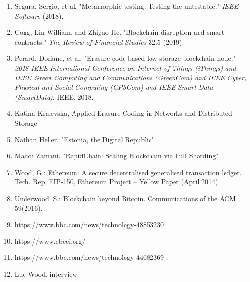 \documentclass[]{article}
\begin{document}
\begin{enumerate}
{  on Peer-to-Peer Systems}. Springer, Berlin, Heidelberg, 2002.
\item
  Segura, Sergio, et al. "Metamorphic testing: Testing the untestable."
  \emph{IEEE Software} (2018).
\item
  Cong, Lin William, and Zhiguo He. "Blockchain disruption and smart
  contracts." \emph{The Review of Financial Studies} 32.5 (2019).
\item
  Perard, Doriane, et al. "Erasure code-based low storage blockchain
  node." \emph{2018 IEEE International Conference on Internet of Things
  (iThings) and IEEE Green Computing and Communications (GreenCom) and
  IEEE Cyber, Physical and Social Computing (CPSCom) and IEEE Smart Data
  (SmartData)}. IEEE, 2018.
\item
  Katina Kralevska, Applied Erasure Coding in Networks and Distributed
  Storage
\item
  Nathan Heller. "Estonia, the Digital Republic"
\item
  Mahdi Zamani. "RapidChain: Scaling Blockchain via Full Sharding"
\item
  Wood, G.: Ethereum: A secure decentralised generalised transaction
  ledger. Tech. Rep. EIP-150, Ethereum Project -- Yellow Paper (April
  2014)
\item
  Underwood, S.: Blockchain beyond Bitcoin. Communications of the ACM
  59(2016).
\item
  https://www.bbc.com/news/technology-48853230
\item
  https://www.cbeci.org/
\item
  https://www.bbc.com/news/technology-44682369
\item
  Luc Wood, interview
\end{enumerate}
\end{document}
